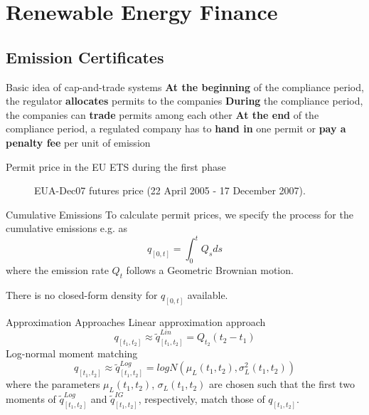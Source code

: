 \section{Renewable Energy Finance}
\subsection{Emission Certificates}

Basic idea of cap-and-trade systems
   \textbf{At the beginning} of the compliance period, the regulator \textbf{allocates} permits to the companies
   \textbf{During} the compliance period, the companies can \textbf{trade} permits among each other
   \textbf{At the end} of the compliance period, a regulated company has to \textbf{hand in} one permit or \textbf{pay a penalty fee} per unit of emission
  

Permit price in the EU ETS during the first phase
\begin{center}
	\begin{figure}[h!]
	\centering
	\caption{EUA-Dec07 futures price (22 April 2005 - 17 December 2007).}
	\label{fig:plotCar00-Data}
	\end{figure}
\end{center}



Cumulative Emissions
	To calculate permit prices, we specify the process for the cumulative emissions e.g. as 
	$$
		q_{[0,t]} = \int_0^t Q_s ds
	$$
	where the emission rate $Q_t$ follows a Geometric Brownian motion.

	There is no closed-form density for $q_{[0,t]}$ available.


Approximation Approaches
	Linear approximation approach 
		$$
		q_{[t_1,t_2]} \approx \tilde{q}^{Lin}_{[t_1,t_2]} = Q_{t_2} (t_2 - t_1)
		$$
	Log-normal moment matching
		$$
		q_{[t_1,t_2]} \approx \tilde{q}^{Log}_{[t_1,t_2]} = logN \left(\mu_L(t_1,t_2), \sigma^2_L(t_1,t_2) \right) \label{ECumApprox2}
		$$
		where the parameters $\mu_L(t_1,t_2)$, $\sigma_L(t_1,t_2)$ are chosen such that the first two moments of $\tilde{q}^{Log}_{[t_1,t_2]}$ and $\tilde{q}^{IG}_{[t_1,t_2]}$, respectively, 
		match those of $q_{[t_1,t_2]}$.


